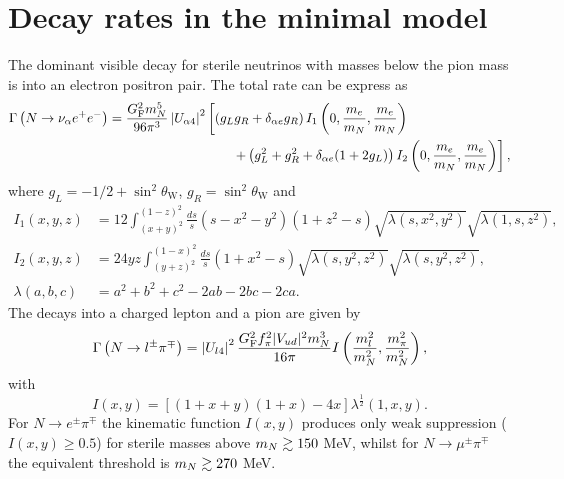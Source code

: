 \documentclass[11pt, a4paper]{article}
\def\ster{\ensuremath N}
\begin{document}
\appendix

\section{\label{app:decayrates}Decay rates in the minimal model}

The dominant visible decay for sterile neutrinos with masses below the pion
mass is into an electron positron pair. The total rate can be express as
%
\begin{align*} \Gamma\left(\ster\to \nu_\alpha e^+e^-\right) =
\frac{G_\text{F}^2m_\ster^5}{96\pi^3}\left|U_{\alpha 4}\right|^2&\left[\left( g_Lg_R + \delta_{\alpha e}g_R\right)I_1\left(0,\frac{m_e}{m_\ster}, \frac{
m_e}{m_\ster}\right)\right.\\ 
&\left.\qquad + \left(g_L^2 + g_R^2 + \delta_{\alpha e}(1+2g_L)\right)I_2\left(0,\frac{m_e}{m_\ster},\frac{m_e}{m_\ster}\right)\right],  \end{align*}
%
where $g_L = -1/2 + \sin^2\theta_\text{W}$, $g_R = \sin^2\theta_\text{W}$ and
% 
\begin{align*} I_1(x,y,z) & =12 \int_{(x+y)^2}^{(1-z)^2}
\frac{ds}{s}(s-x^2-y^2)(1+z^2-s)\sqrt{\lambda(s,x^2,y^2)}\sqrt{\lambda(1,s,z^2)},\\
I_2(x,y,z)& =24yz\int_{(y+z)^2}^{(1-x)^2}\frac{ds}{s}\left(1+x^2-s\right)\sqrt{\lambda\left(s,y^2,z^2\right)}\sqrt{\lambda\left(s,y^2,z^2\right)},\\
\lambda(a,b,c) &= a^2+b^2+c^2 - 2ab-2bc-2ca.  \end{align*}
%
The decays into a charged lepton and a pion are given by 
%
\[ \Gamma\left(\ster\to l^\pm\pi^\mp\right) =
\left|U_{l4}\right|^2\frac{G_\text{F}^2f_\pi^2 |V_{ud}|^2
m_\ster^3}{16\pi}I\left(\frac{m_l^2}{m_\ster^2} ,
\frac{m_\pi^2}{m_\ster^2}\right) , \] 
%
with \[ I(x,y) = \left[ \left( 1+x+y\right) \left(1+x\right) -4 x\right]
\lambda^\frac{1}{2}\left(1,x,y\right).  \]
%
For $N\to e^\pm\pi^\mp$ the kinematic function $I(x,y)$ produces only weak suppression ($I(x,y)\geq 0.5$) for sterile masses above $m_\ster\gtrsim 150$ MeV, whilst for $N\to
\mu^\pm\pi^\mp$ the equivalent threshold is $m_\ster\gtrsim 270$ MeV.
\end{document}
